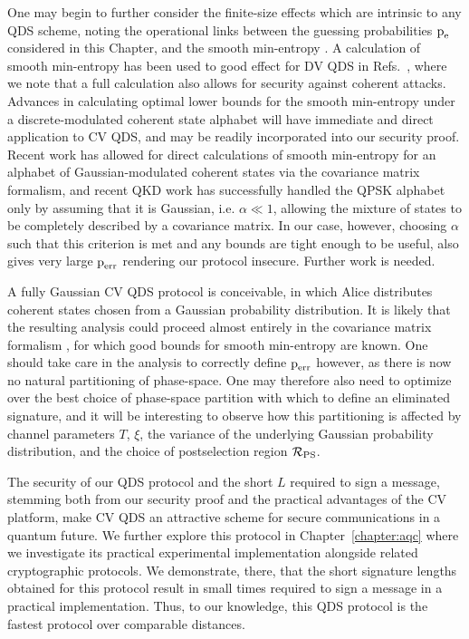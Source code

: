 One may begin to further consider the finite-size effects \cite{Tomamichel2016} which are intrinsic to any QDS scheme, noting the operational links between the guessing probabilities $\text{p}_{\text{e}}$ considered in this Chapter, and the smooth min-entropy \cite{Konig2009}. A calculation of smooth min-entropy has been used to good effect for DV QDS in Refs.~\cite{Amiri2016, Puthoor2016}, where we note that a full calculation also allows for security against coherent attacks. Advances in calculating optimal lower bounds for the smooth min-entropy under a discrete-modulated coherent state alphabet will have immediate and direct application to CV QDS, and may be readily incorporated into our security proof. Recent work \cite{Seshadreesan2017} has allowed for direct calculations of smooth min-entropy for an alphabet of Gaussian-modulated coherent states via the covariance matrix formalism, and recent QKD work \cite{Ghorai2019, Lin2019} has successfully handled the QPSK alphabet only by assuming that it is Gaussian, i.e. $\alpha \ll 1$, allowing the mixture of states to be completely described by a covariance matrix. In our case, however, choosing $\alpha$ such that this criterion is met and any bounds are tight enough to be useful, also gives very large $\text{p}_{\text{err}}$ rendering our protocol insecure. Further work is needed.

A fully Gaussian CV QDS protocol is conceivable, in which Alice distributes coherent states chosen from a Gaussian probability distribution. It is likely that the resulting analysis could proceed almost entirely in the covariance matrix formalism \cite{Weedbrook2012, Serafini2017}, for which good bounds for smooth min-entropy are known. One should take care in the analysis to correctly define $\text{p}_{\text{err}}$ however, as there is now no natural partitioning of phase-space. One may therefore also need to optimize over the best choice of phase-space partition with which to define an eliminated signature, and it will be interesting to observe how this partitioning is affected by channel parameters $T$, $\xi$, the variance of the underlying Gaussian probability distribution, and the choice of postselection region $\mathcal{R}_{\text{PS}}$.


The security of our QDS protocol and the short $L$ required to sign a message, stemming both from our security proof and the practical advantages of the CV platform, make CV QDS an attractive scheme for secure communications in a quantum future. We further explore this protocol in Chapter~\ref{chapter:aqc} where we investigate its practical experimental implementation alongside related cryptographic protocols. We demonstrate, there, that the short signature lengths obtained for this protocol result in small times required to sign a message in a practical implementation. Thus, to our knowledge, this QDS protocol is the fastest protocol over comparable distances.

